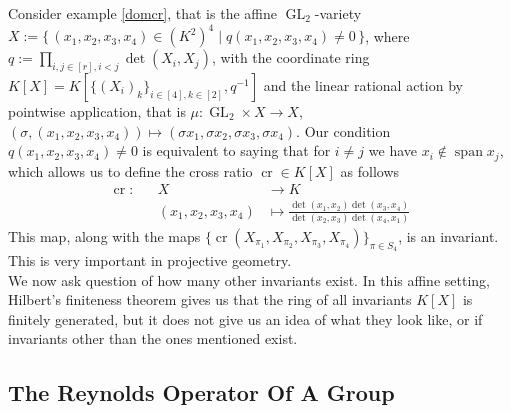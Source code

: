 \begin{dexample}\label{crinv}
  Consider example \ref{domcr}, that is the affine $\operatorname{GL}_2$-variety $X := \{\, (x_1,x_2,x_3,x_4) \in (K^2)^4 \mid q(x_1,x_2,x_3,x_4) \neq 0 \,\}$, where $q := \prod_{i,j \in [r], i<j} \operatorname{det}(X_i,X_j)$, with the coordinate ring $K[X] = K[\{(X_i)_k\}_{i \in [4], k \in [2]},q^{-1}]$ and the linear rational action by pointwise application, that is $\mu \colon \operatorname{GL}_2 \times X \rightarrow X$, $(\sigma,(x_1,x_2,x_3,x_4)) \mapsto (\sigma x_1,\sigma x_2,\sigma x_3,\sigma x_4)$.
  Our condition $q(x_1,x_2,x_3,x_4) \neq 0$ is equivalent to saying that for $i\neq j$ we have $x_i \notin \operatorname{span}{x_j}$, which allows us to define the cross ratio $\operatorname{cr} \in K[X]$ as follows
  \begin{equation}
    \begin{aligned}
      \operatorname{cr} \colon&&X&\rightarrow K \\
      &&(x_1,x_2,x_3,x_4) &\longmapsto \frac{\operatorname{det}(x_1,x_2)\operatorname{det}(x_3,x_4)}{\operatorname{det}(x_2,x_3)\operatorname{det}(x_4,x_1)}
    \end{aligned}
  \end{equation}
  This map, along with the maps $\{\operatorname{cr}(X_{\pi_1},X_{\pi_2},X_{\pi_3},X_{\pi_4})\}_{\pi \in S_4}$, is an invariant.
  This is very important in projective geometry.\\
  We now ask question of how many other invariants exist.
  In this affine setting, Hilbert's finiteness theorem gives us that the ring of all invariants $K[X]$ is finitely generated, but it does not give us an idea of what they look like, or if invariants other than the ones mentioned exist.
\end{dexample}

\subsection{The Reynolds Operator Of A Group}



